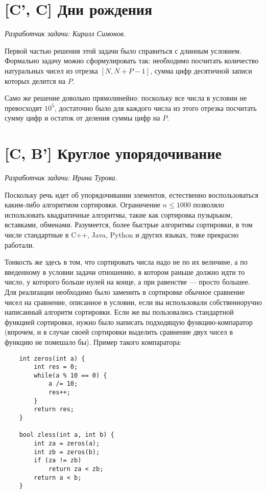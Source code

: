 \documentclass[12pt]{article}
\theoremstyle{definition}
\begin{document}
\section{[C', C] Дни рождения}
\textit{Разработчик задачи: Кирилл Симонов.}

Первой частью решения этой задачи было справиться с длинным условием.
Формально задачу можно сформулировать так: необходимо посчитать количество натуральных
чисел из отрезка $[N, N + P - 1]$, сумма цифр десятичной записи которых делится на $P$.

Само же решение довольно прямолинейно: поскольку все числа в условии не превосходят $10^5$,
достаточно было для каждого числа из этого отрезка посчитать сумму цифр
и остаток от деления суммы цифр на $P$.

\section{[C, B'] Круглое упорядочивание}
\textit{Разработчик задачи: Ирина Турова.}

Поскольку речь идет об упорядочивании элементов, естественно воспользоваться
каким-либо алгоритмом сортировки. Ограничение $n \le 1000$ позволяло использовать
квадратичные алгоритмы, такие как сортировка пузырьком, вставками, обменами. Разумеется,
более быстрые алгоритмы сортировки, в том числе стандартные в C++, Java, Python и других языках, тоже прекрасно работали.

Тонкость же здесь в том, что сортировать числа надо не по их величине, а по введенному в
условии задачи отношению, в котором раньше должно идти то число, у которого больше нулей
на конце, а при равенстве --- просто большее. Для реализации необходимо было
заменить в сортировке обычное сравнение чисел на сравнение, описанное в условии,
если вы использовали собственноручно написанный алгоритм сортировки. Если же вы
пользовались стандартной функцией сортировки, нужно было написать
подходящую функцию-компаратор (впрочем, и в случае своей сортировки выделить сравнение
двух чисел в функцию не помешало бы). Пример такого компаратора:
\begin{lstlisting}
    int zeros(int a) {
        int res = 0;
        while(a % 10 == 0) {
            a /= 10;
            res++;
        }
        return res;
    }

    bool zless(int a, int b) {
        int za = zeros(a);
        int zb = zeros(b);
        if (za != zb)
            return za < zb;
        return a < b;
    }
\end{lstlisting}
\end{document}
